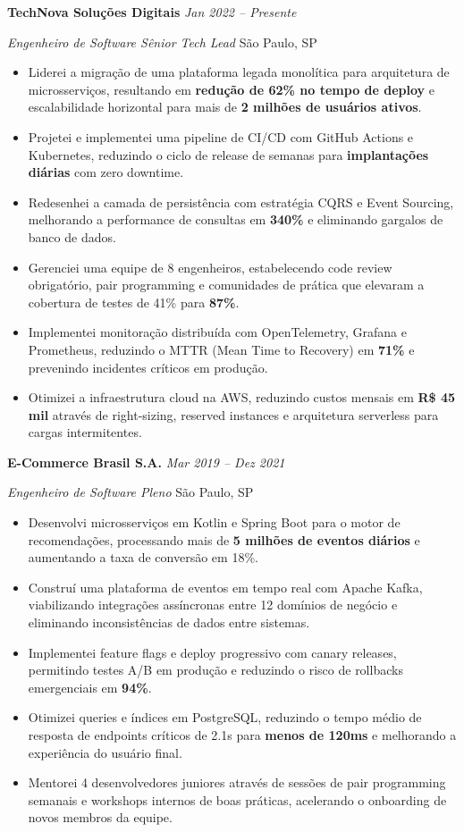 \documentclass[11pt,a4paper]{article}
\newcommand{\ressection}[1]{%
  \vspace{1.6\baselineskip}%
  \noindent{\color{brgreen}\Large\bfseries\MakeUppercase{#1}}%
  \vspace{0.1\baselineskip}\par
  \noindent{\color{bryellow}\rule{\textwidth}{1.2pt}}%
  \vspace{0.7\baselineskip}\par
}
\newcommand{\roleheader}[4]{%
  \noindent\textbf{\large #1} \hfill \textcolor{brblue}{\small\textit{#2}}\par
  \noindent\textit{#3} \hfill \textcolor{brdark}{\small #4}\par
  \vspace{0.25cm}%
}
\begin{document}
\ressection{Experiência Profissional}

\roleheader{TechNova Soluções Digitais}{Jan 2022 -- Presente}{Engenheiro de Software Sênior \textbar{} Tech Lead}{São Paulo, SP}

\begin{itemize}
  \item Liderei a migração de uma plataforma legada monolítica para arquitetura de microsserviços, resultando em \textbf{redução de 62\% no tempo de deploy} e escalabilidade horizontal para mais de \textbf{2 milhões de usuários ativos}.
  \item Projetei e implementei uma pipeline de CI/CD com GitHub Actions e Kubernetes, reduzindo o ciclo de release de semanas para \textbf{implantações diárias} com zero downtime.
  \item Redesenhei a camada de persistência com estratégia CQRS e Event Sourcing, melhorando a performance de consultas em \textbf{340\%} e eliminando gargalos de banco de dados.
  \item Gerenciei uma equipe de 8 engenheiros, estabelecendo code review obrigatório, pair programming e comunidades de prática que elevaram a cobertura de testes de 41\% para \textbf{87\%}.
  \item Implementei monitoração distribuída com OpenTelemetry, Grafana e Prometheus, reduzindo o MTTR (Mean Time to Recovery) em \textbf{71\%} e prevenindo incidentes críticos em produção.
  \item Otimizei a infraestrutura cloud na AWS, reduzindo custos mensais em \textbf{R\$ 45 mil} através de right-sizing, reserved instances e arquitetura serverless para cargas intermitentes.
\end{itemize}

\vspace{0.6cm}

\roleheader{E-Commerce Brasil S.A.}{Mar 2019 -- Dez 2021}{Engenheiro de Software Pleno}{São Paulo, SP}

\begin{itemize}
  \item Desenvolvi microsserviços em Kotlin e Spring Boot para o motor de recomendações, processando mais de \textbf{5 milhões de eventos diários} e aumentando a taxa de conversão em 18\%.
  \item Construí uma plataforma de eventos em tempo real com Apache Kafka, viabilizando integrações assíncronas entre 12 domínios de negócio e eliminando inconsistências de dados entre sistemas.
  \item Implementei feature flags e deploy progressivo com canary releases, permitindo testes A/B em produção e reduzindo o risco de rollbacks emergenciais em \textbf{94\%}.
  \item Otimizei queries e índices em PostgreSQL, reduzindo o tempo médio de resposta de endpoints críticos de 2.1s para \textbf{menos de 120ms} e melhorando a experiência do usuário final.
  \item Mentorei 4 desenvolvedores juniores através de sessões de pair programming semanais e workshops internos de boas práticas, acelerando o onboarding de novos membros da equipe.
\end{itemize}
\end{document}
